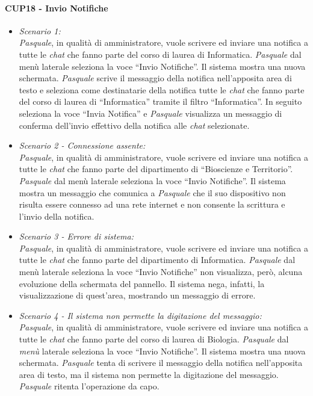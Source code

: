 \paragraph{CUP18 - Invio Notifiche \\}
\begin{itemize}
	\item \textit{Scenario 1:\\}
	\textit{Pasquale}, in qualità di amministratore, vuole scrivere ed inviare una notifica a tutte le \textit{chat} che fanno parte del corso di laurea di Informatica. \textit{Pasquale} dal menù laterale seleziona la voce “Invio Notifiche”. Il sistema mostra una nuova schermata. \textit{Pasquale} scrive il messaggio della notifica nell’apposita area di testo e seleziona come destinatarie della notifica tutte le \textit{chat} che fanno parte del corso di laurea di “Informatica” tramite il filtro “Informatica”. In seguito seleziona la voce “Invia Notifica” e \textit{Pasquale} visualizza un messaggio di conferma dell’invio effettivo della notifica alle \textit{chat} selezionate.\\
	
	\item \textit{Scenario 2 - Connessione assente:\\}
	\textit{Pasquale}, in qualità di amministratore, vuole scrivere ed inviare una notifica a tutte le \textit{chat} che fanno parte del dipartimento di “Bioscienze e Territorio”. \textit{Pasquale} dal menù laterale seleziona la voce “Invio Notifiche”. Il sistema mostra un messaggio che comunica a \textit{Pasquale} che il suo dispositivo non risulta essere connesso ad una rete internet e non consente la scrittura e l’invio della notifica.\\
	
	\item \textit{Scenario 3 - Errore di sistema:\\}
	\textit{Pasquale}, in qualità di amministratore, vuole scrivere ed inviare una notifica a tutte le \textit{chat} che fanno parte del dipartimento di Informatica. \textit{Pasquale} dal menù laterale seleziona la voce “Invio Notifiche” non visualizza, però, alcuna evoluzione della schermata del pannello. Il sistema nega, infatti, la visualizzazione di quest’area, mostrando un messaggio di errore.\\
	
	\item \textit{Scenario 4 - Il sistema non permette la digitazione del messaggio:\\}
	\textit{Pasquale}, in qualità di amministratore, vuole scrivere ed inviare una notifica a tutte le \textit{chat} che fanno parte del corso di laurea di Biologia. \textit{Pasquale} dal \textit{menù} laterale seleziona la voce “Invio Notifiche”. Il sistema mostra una nuova schermata. \textit{Pasquale} tenta di scrivere il messaggio della notifica nell’apposita area di testo, ma il sistema non permette la digitazione del messaggio. \textit{Pasquale} ritenta l’operazione da capo.\\
	

\end{itemize}
